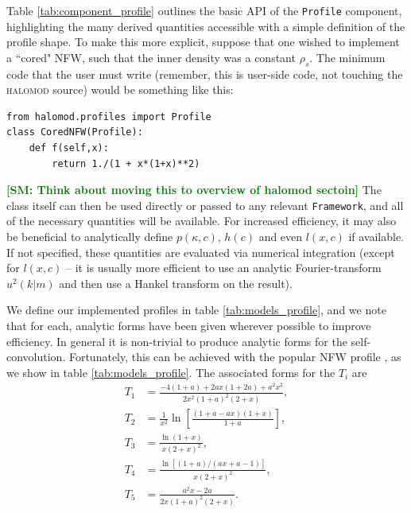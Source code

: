 \documentclass[5p]{elsarticle}
\newcommand{\sgm}[1]{\textcolor{green}{\textbf{[SM: #1]}}}
\begin{document}
Table \ref{tab:component_profile} outlines the basic API of the \verb|Profile| component, highlighting the many derived quantities accessible with a simple definition of the profile shape. To make this more explicit, suppose that one wished to implement a ``cored" NFW, such that the inner density was a constant $\rho_s$. The minimum code that the user must write (remember, this is user-side code, not touching the \textsc{halomod} source) would be something like this:
\begin{lstlisting}
from halomod.profiles import Profile
class CoredNFW(Profile):
    def f(self,x):
        return 1./(1 + x*(1+x)**2)
\end{lstlisting}
\sgm{Think about moving this to overview of halomod sectoin}
The class itself can then be used directly or passed to any relevant \verb|Framework|, and all of the necessary quantities will be available. For increased efficiency, it may also be beneficial to analytically define $p(\kappa,c)$, $h(c)$ and even $l(x,c)$ if available. If not specified, these quantities are evaluated via numerical integration (except for $l(x,c)$ -- it is usually more efficient to use an analytic Fourier-transform $u^2(k|m)$ and then use a Hankel transform on the result).

We define our implemented profiles in table \ref{tab:models_profile}, and we note that for each, analytic forms have been given wherever possible to improve efficiency. In general it is non-trivial to produce analytic forms for the self-convolution. Fortunately, this can be achieved with the popular NFW profile \citep{Sheth2001a}, as we show in table \ref{tab:models_profile}. The associated forms for the $T_i$ are
\begin{subequations}
    \label{eq:nfw_t}
    \begin{align}
        T_1 &= \frac{-4(1+a)+2ax(1+2a)+a^2x^2}{2x^2(1+a)^2(2+x)},\\
        T_2 &= \frac{1}{x^2}\ln\left[\frac{(1+a-ax)(1+x)}{1+a}\right], \\
        T_3 &= \frac{\ln(1+x)}{x(2+x)^2}, \\
        T_4 &= \frac{\ln[(1+a)/(ax+a-1)]}{x(2+x)^2}, \\
        T_5 &= \frac{a^2x-2a}{2x(1+a)^2(2+x)}.
    \end{align}
\end{subequations}
\end{document}
